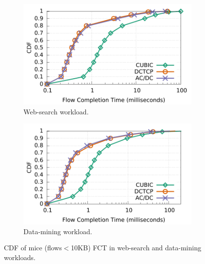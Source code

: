 \begin{figure}[!t]
        \centering
        \begin{subfigure}[b]{0.45\textwidth}
                \centering
                \includegraphics[width=\textwidth]{acdctcp/figures/macro_benchmarks/trace-driven/trace_driven_workload_dctcp_senders5_10points.pdf}
                \caption{Web-search workload.}
                \label{trace-driven-searching-fct}
        \end{subfigure}
        \begin{subfigure}[b]{0.45\textwidth}
                \centering
                \includegraphics[width=\textwidth]{acdctcp/figures/macro_benchmarks/trace-driven/trace_driven_workload_conga_senders5_10points.pdf}
                \caption{Data-mining workload.}
                \label{trace-driven-data-mining-fct}
        \end{subfigure}
        \caption{CDF of mice (flows$<$10KB) FCT in web-search and data-mining workloads.}
        \label{macro-trace-driven-fct}
\end{figure}

